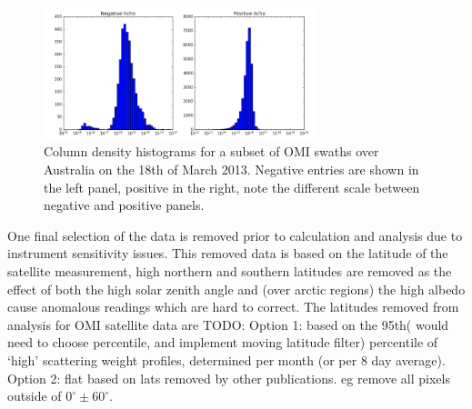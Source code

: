     \begin{figure}[!htbp]\begin{center}
      \includegraphics[width=0.7\textwidth]{Figures/AusOMHCHO_Hist_20130318.png}
      \caption{Column density histograms for a subset of OMI swaths over Australia on the 18th of March 2013.
      Negative entries are shown in the left panel, positive in the right, note the different scale between negative and positive panels.}
      \label{ch_HCHO:fig:OMI_negative_hist}
    \end{center}\end{figure}
    
    One final selection of the data is removed prior to calculation and analysis due to instrument sensitivity issues.
    This removed data is based on the latitude of the satellite measurement, high northern and southern latitudes are removed as the effect of both the high solar zenith angle and (over arctic regions) the high albedo cause anomalous readings which are hard to correct.
    The latitudes removed from analysis for OMI satellite data are TODO:
    Option 1: based on the 95th( would need to choose percentile, and implement moving latitude filter) percentile of `high' scattering weight profiles, determined per month (or per 8 day average).
    Option 2: flat based on lats removed by other publications. eg remove all pixels outside of $0^\circ \pm 60^\circ$.
  
    
